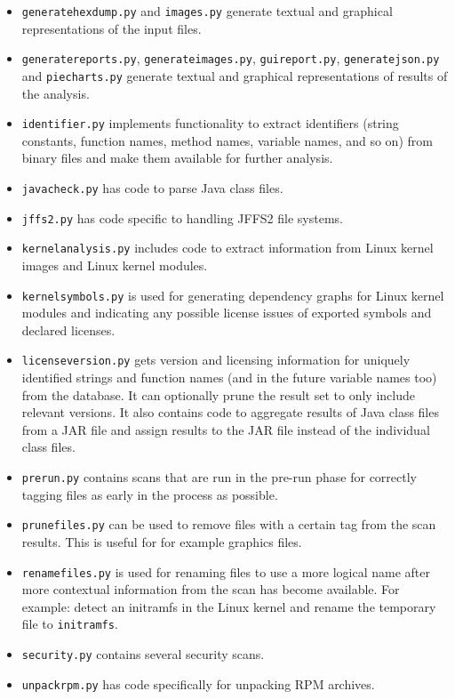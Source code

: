 \documentclass[10pt,a4paper]{article}
\begin{document}
\begin{itemize}
\item \texttt{generatehexdump.py} and \texttt{images.py} generate textual and
graphical representations of the input files.
\item \texttt{generatereports.py}, \texttt{generateimages.py},
\texttt{guireport.py}, \texttt{generatejson.py} and \texttt{piecharts.py}
generate textual and graphical representations of results of the analysis.
\item \texttt{identifier.py} implements functionality to extract identifiers
(string constants, function names, method names, variable names, and so on)
from binary files and make them available for further analysis.
\item \texttt{javacheck.py} has code to parse Java class files.
\item \texttt{jffs2.py} has code specific to handling JFFS2 file systems.
\item \texttt{kernelanalysis.py} includes code to extract information from
Linux kernel images and Linux kernel modules.
\item \texttt{kernelsymbols.py} is used for generating dependency graphs for
Linux kernel modules and indicating any possible license issues of exported
symbols and declared licenses.
\item \texttt{licenseversion.py} gets version and licensing information for
uniquely identified strings and function names (and in the future variable names
too) from the database. It can optionally prune the result set to only include
relevant versions. It also contains code to aggregate results of Java class
files from a JAR file and assign results to the JAR file instead of the
individual class files.
\item \texttt{prerun.py} contains scans that are run in the pre-run phase for
correctly tagging files as early in the process as possible.
\item \texttt{prunefiles.py} can be used to remove files with a certain tag
from the scan results. This is useful for for example graphics files.
\item \texttt{renamefiles.py} is used for renaming files to use a more logical
name after more contextual information from the scan has become available. For
example: detect an initramfs in the Linux kernel and rename the temporary file
to \texttt{initramfs}.
\item \texttt{security.py} contains several security scans.
\item \texttt{unpackrpm.py} has code specifically for unpacking RPM archives.
\end{itemize}
\end{document}
